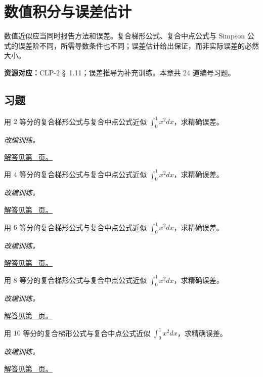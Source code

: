 \documentclass[12pt,fontset=fandol]{ctexart}
\begin{document}
\clearpage
\section{数值积分与误差估计}\label{sec:ch18}
数值近似应当同时报告方法和误差。复合梯形公式、复合中点公式与 Simpson 公式的误差阶不同，所需导数条件也不同；误差估计给出保证，而非实际误差的必然大小。

\textbf{资源对应：}CLP-2 \S~1.11；误差推导为补充训练。本章共 24 道编号习题。
\subsection{习题}
\begin{example}[二次函数的梯形与中点公式]\label{ex:c18q1}
用 $2$ 等分的复合梯形公式与复合中点公式近似 $\int_0^1x^2dx$，求精确误差。
\par\textit{改编训练。}\par\hyperref[ans:c18q1]{解答见第~\pageref{ans:c18q1} 页。}
\end{example}
\begin{example}[二次函数的梯形与中点公式]\label{ex:c18q2}
用 $4$ 等分的复合梯形公式与复合中点公式近似 $\int_0^1x^2dx$，求精确误差。
\par\textit{改编训练。}\par\hyperref[ans:c18q2]{解答见第~\pageref{ans:c18q2} 页。}
\end{example}
\begin{example}[二次函数的梯形与中点公式]\label{ex:c18q3}
用 $6$ 等分的复合梯形公式与复合中点公式近似 $\int_0^1x^2dx$，求精确误差。
\par\textit{改编训练。}\par\hyperref[ans:c18q3]{解答见第~\pageref{ans:c18q3} 页。}
\end{example}
\begin{example}[二次函数的梯形与中点公式]\label{ex:c18q4}
用 $8$ 等分的复合梯形公式与复合中点公式近似 $\int_0^1x^2dx$，求精确误差。
\par\textit{改编训练。}\par\hyperref[ans:c18q4]{解答见第~\pageref{ans:c18q4} 页。}
\end{example}
\begin{example}[二次函数的梯形与中点公式]\label{ex:c18q5}
用 $10$ 等分的复合梯形公式与复合中点公式近似 $\int_0^1x^2dx$，求精确误差。
\par\textit{改编训练。}\par\hyperref[ans:c18q5]{解答见第~\pageref{ans:c18q5} 页。}
\end{example}
\end{document}
